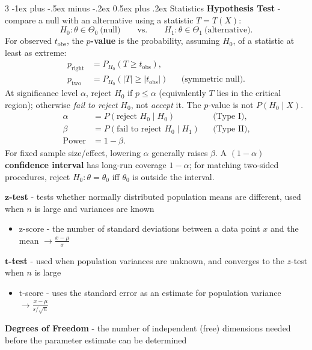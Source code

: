 \documentclass[10pt,landscape]{article}
\makeatletter
\renewcommand{\section}{\@startsection{section}{1}{0mm}%
                                {-1ex plus -.5ex minus -.2ex}%
                                {0.5ex plus .2ex}%
                                {\normalfont\large\bfseries}}
\makeatother
\begin{document}
\begin{multicols}{3}
        \section{Statistics}
        \textbf{Hypothesis Test} - compare a null with an alternative using a statistic $T=T(X)$:
        \[
            H_0:\theta\in\Theta_0\ \text{(null)}
            \qquad\text{vs.}\qquad
            H_1:\theta\in\Theta_1\ \text{(alternative)}.
        \]
        For observed $t_{\mathrm{obs}}$, the \textbf{$p$-value} is the probability, assuming $H_0$, of a statistic at least as extreme:
        \[
            \begin{aligned}
                p_{\mathrm{right}}&=P_{H_0}(T\ge t_{\mathrm{obs}}),\\
                p_{\mathrm{two}}&=P_{H_0}(|T|\ge|t_{\mathrm{obs}}|)
                &&\text{(symmetric null)}.
            \end{aligned}
        \]
        At significance level $\alpha$, reject $H_0$ if $p\le\alpha$ (equivalently $T$ lies in the critical region); otherwise \emph{fail to reject} $H_0$, not \emph{accept} it. The $p$-value is not $P(H_0\mid X)$.
        \[
            \begin{aligned}
                \alpha&=P(\text{reject }H_0\mid H_0) &&\text{(Type I)},\\
                \beta&=P(\text{fail to reject }H_0\mid H_1) &&\text{(Type II)},\\
                \text{Power}&=1-\beta.
            \end{aligned}
        \]
        For fixed sample size/effect, lowering $\alpha$ generally raises $\beta$. A $(1-\alpha)$ \textbf{confidence interval} has long-run coverage $1-\alpha$; for matching two-sided procedures, reject $H_0:\theta=\theta_0$ iff $\theta_0$ is outside the interval.

    $\boldsymbol{z}$\textbf{-test} - tests whether normally distributed population means are different, used when $n$ is large and variances are known
        \vspace{-.5mm}
        \begin{itemize}[label={--},leftmargin=4mm]
            \itemsep -.4mm
            \item z-score - the number of standard deviations between a data point $x$ and the mean $\to \frac{x - \mu}{\sigma}$
        \end{itemize}
        \vspace{-.5mm}
    $\boldsymbol{t}$\textbf{-test} - used when population variances are unknown, and converges to the $z$-test when $n$ is large
        \vspace{-.5mm}
        \begin{itemize}[label={--},leftmargin=4mm]
            \itemsep -.4mm
            \item t-score - uses the standard error as an estimate for population variance $\to \frac{x - \mu}{s/\sqrt{n}}$
        \end{itemize}
        \vspace{-1mm}
        \textbf{Degrees of Freedom} - the number of independent (free) dimensions needed before the parameter estimate can be determined


\end{multicols}
\end{document}

